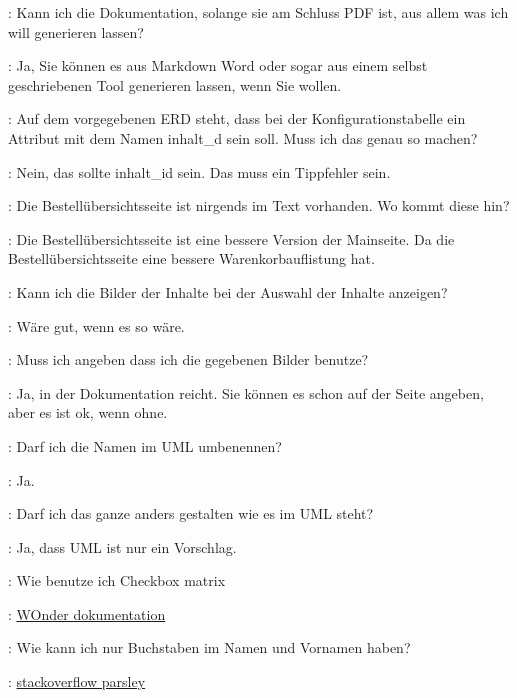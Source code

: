 \documentclass[a4paper, 11pt]{article}
\begin{document}
\begin{drama}

\msspeaks: Kann ich die Dokumentation, solange sie am Schluss PDF ist, aus allem was ich will generieren lassen?

\dozentspeaks: Ja, Sie können es aus Markdown Word oder sogar aus einem selbst geschriebenen Tool generieren lassen, wenn Sie wollen.

\msspeaks: Auf dem vorgegebenen ERD steht, dass bei der Konfigurationstabelle ein Attribut mit dem Namen inhalt\_d sein soll. Muss ich das genau so machen?

\dozentspeaks: Nein, das sollte inhalt\_id sein. Das muss ein Tippfehler sein.

\msspeaks: Die Bestellübersichtsseite ist nirgends im Text vorhanden. Wo kommt diese hin?

\dozentspeaks: Die Bestellübersichtsseite ist eine bessere Version der Mainseite. Da die Bestellübersichtsseite eine bessere Warenkorbauflistung hat.

\msspeaks: Kann ich die Bilder der Inhalte bei der Auswahl der Inhalte anzeigen?

\dozentspeaks: Wäre gut, wenn es so wäre.

\msspeaks: Muss ich angeben dass ich die gegebenen Bilder benutze?

\dozentspeaks: Ja, in der Dokumentation reicht. Sie können es schon auf der Seite angeben, aber es ist ok, wenn ohne.

\msspeaks: Darf ich die Namen im UML umbenennen?

\dozentspeaks: Ja.

\msspeaks: Darf ich das ganze anders gestalten wie es im UML steht?

\dozentspeaks: Ja, dass UML ist nur ein Vorschlag.

\msspeaks: Wie benutze ich Checkbox matrix

\internetspeaks: \href{https://github.com/wocommunity/wonder/blob/4d7f6bf9236c3005359101d6f3c9e6224d47750e/Frameworks/Core/JavaWOExtensions/Sources/com/webobjects/woextensions/WOCheckboxMatrix.java}{WOnder dokumentation}

\msspeaks: Wie kann ich nur Buchstaben im Namen und Vornamen haben?

\internetspeaks: \href{https://stackoverflow.com/questions/23415795/how-to-only-allow-text-in-parsely-js-validation}{stackoverflow parsley}


\end{drama}
\end{document}
